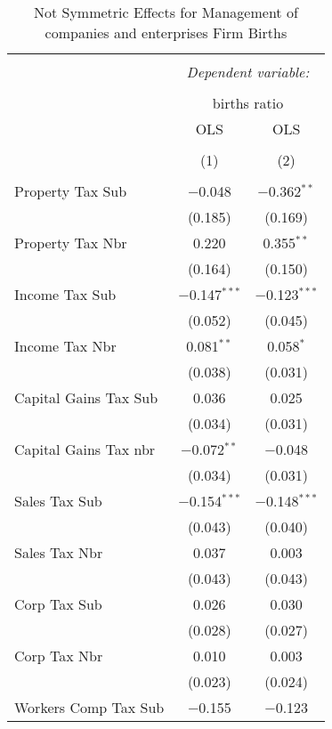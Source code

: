 
\begin{table}[!htbp] \centering 
  \caption{Not Symmetric Effects for  Management of companies and enterprises Firm Births} 
  \label{} 
\begin{tabular}{@{\extracolsep{5pt}}lcc} 
\\[-1.8ex]\hline 
\hline \\[-1.8ex] 
 & \multicolumn{2}{c}{\textit{Dependent variable:}} \\ 
\cline{2-3} 
\\[-1.8ex] & \multicolumn{2}{c}{births ratio} \\ 
 & OLS & OLS \\ 
\\[-1.8ex] & (1) & (2)\\ 
\hline \\[-1.8ex] 
 Property Tax Sub & $-$0.048 & $-$0.362$^{**}$ \\ 
  & (0.185) & (0.169) \\ 
  Property Tax Nbr & 0.220 & 0.355$^{**}$ \\ 
  & (0.164) & (0.150) \\ 
  Income Tax Sub & $-$0.147$^{***}$ & $-$0.123$^{***}$ \\ 
  & (0.052) & (0.045) \\ 
  Income Tax Nbr & 0.081$^{**}$ & 0.058$^{*}$ \\ 
  & (0.038) & (0.031) \\ 
  Capital Gains Tax Sub & 0.036 & 0.025 \\ 
  & (0.034) & (0.031) \\ 
  Capital Gains Tax nbr & $-$0.072$^{**}$ & $-$0.048 \\ 
  & (0.034) & (0.031) \\ 
  Sales Tax Sub & $-$0.154$^{***}$ & $-$0.148$^{***}$ \\ 
  & (0.043) & (0.040) \\ 
  Sales Tax Nbr & 0.037 & 0.003 \\ 
  & (0.043) & (0.043) \\ 
  Corp Tax Sub & 0.026 & 0.030 \\ 
  & (0.028) & (0.027) \\ 
  Corp Tax Nbr & 0.010 & 0.003 \\ 
  & (0.023) & (0.024) \\ 
  Workers Comp Tax Sub & $-$0.155 & $-$0.123 \\ 

\end{tabular}
\end{table}
